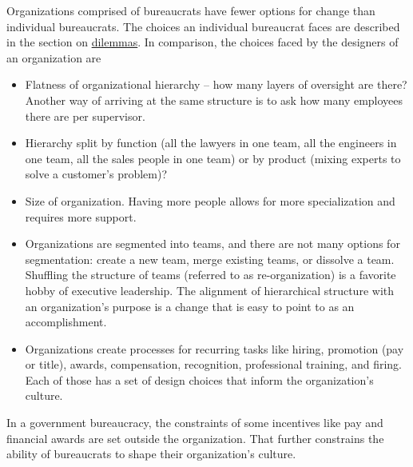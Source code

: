 Organizations comprised of bureaucrats have fewer options for change than individual bureaucrats. The choices an individual bureaucrat faces are described in the section on 
\hyperref[sec:dilemma-trilemma]{dilemmas}.
%
In comparison, the choices faced by the designers of an organization are
\begin{itemize}
    \item Flatness of organizational hierarchy -- how many layers of oversight are there? Another way of arriving at the same structure is to ask how many employees there are per supervisor.
    \item Hierarchy split by function (all the lawyers in one team, all the engineers in one team, all the sales people in one team) or by product (mixing experts to solve a customer's problem)?

    
    \item Size of organization. Having more people allows for more specialization and requires more support. 
    \item Organizations are segmented into teams, and there are not many options for segmentation: create a new team, merge existing teams, or dissolve a team. Shuffling the structure of teams (referred to as re-organization) is a favorite hobby of executive leadership. The alignment of hierarchical structure with an organization's purpose is a change that is easy to point to as an accomplishment. 

    
    \item Organizations create processes for recurring tasks like hiring, promotion (pay or title), awards, compensation, recognition, professional training, and firing. Each of those has a set of design choices that inform the organization's culture.
\end{itemize}
In a government bureaucracy, the constraints of some incentives like pay and financial awards are set outside the organization. That further constrains the ability of bureaucrats to shape their organization's culture.

